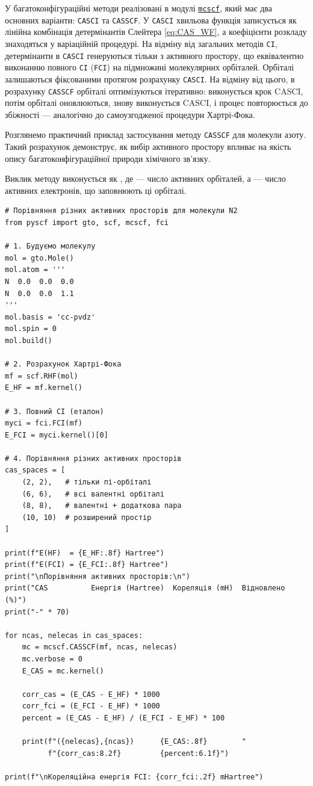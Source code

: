 У \PySCF{} багатоконфігураційні методи реалізовані в модулі \href{https://pyscf.org/user/mcscf.html}{\texttt{mcscf}}, який має два основних варіанти: \texttt{CASCI} та \texttt{CASSCF}. У \texttt{CASCI} хвильова функція записується як лінійна комбінація детермінантів Слейтера \eqref{eq:CAS_WF}, а коефіцієнти розкладу знаходяться у варіаційній процедурі. На відміну від загальних методів \texttt{CI}, детермінанти в \texttt{CASCI} генеруються тільки з активного простору, що еквівалентно виконанню повного \texttt{CI} (\texttt{FCI}) на підмножині молекулярних орбіталей. Орбіталі залишаються фіксованими протягом розрахунку \texttt{CASCI}.
%
На відміну від цього, в розрахунку \texttt{CASSCF} орбіталі оптимізуються ітеративно: виконується крок CASCI, потім орбіталі оновлюються, знову виконується CASCI, і процес повторюється до збіжності --- аналогічно до самоузгодженої процедури Хартрі-Фока.

Розглянемо практичний приклад застосування методу \texttt{CASSCF}
для молекули азоту. Такий розрахунок демонструє, як вибір активного
простору впливає на якість опису багатоконфігураційної природи
хімічного зв'язку.

Виклик методу виконується як , де  --- число активних орбіталей, а  --- число активних електронів, що заповнюють ці орбіталі.

\begin{verbatim}
# Порівняння різних активних просторів для молекули N2
from pyscf import gto, scf, mcscf, fci

# 1. Будуємо молекулу
mol = gto.Mole()
mol.atom = '''
N  0.0  0.0  0.0
N  0.0  0.0  1.1
'''
mol.basis = 'cc-pvdz'
mol.spin = 0
mol.build()

# 2. Розрахунок Хартрі-Фока
mf = scf.RHF(mol)
E_HF = mf.kernel()

# 3. Повний CI (еталон)
myci = fci.FCI(mf)
E_FCI = myci.kernel()[0]

# 4. Порівняння різних активних просторів
cas_spaces = [
    (2, 2),   # тільки пі-орбіталі
    (6, 6),   # всі валентні орбіталі
    (8, 8),   # валентні + додаткова пара
    (10, 10)  # розширений простір
]

print(f"E(HF)  = {E_HF:.8f} Hartree")
print(f"E(FCI) = {E_FCI:.8f} Hartree")
print("\nПорівняння активних просторів:\n")
print("CAS          Енергія (Hartree)  Кореляція (mH)  Відновлено (%)")
print("-" * 70)

for ncas, nelecas in cas_spaces:
    mc = mcscf.CASSCF(mf, ncas, nelecas)
    mc.verbose = 0
    E_CAS = mc.kernel()

    corr_cas = (E_CAS - E_HF) * 1000
    corr_fci = (E_FCI - E_HF) * 1000
    percent = (E_CAS - E_HF) / (E_FCI - E_HF) * 100

    print(f"({nelecas},{ncas})      {E_CAS:.8f}        "
          f"{corr_cas:8.2f}         {percent:6.1f}")

print(f"\nКореляційна енергія FCI: {corr_fci:.2f} mHartree")
\end{verbatim}

